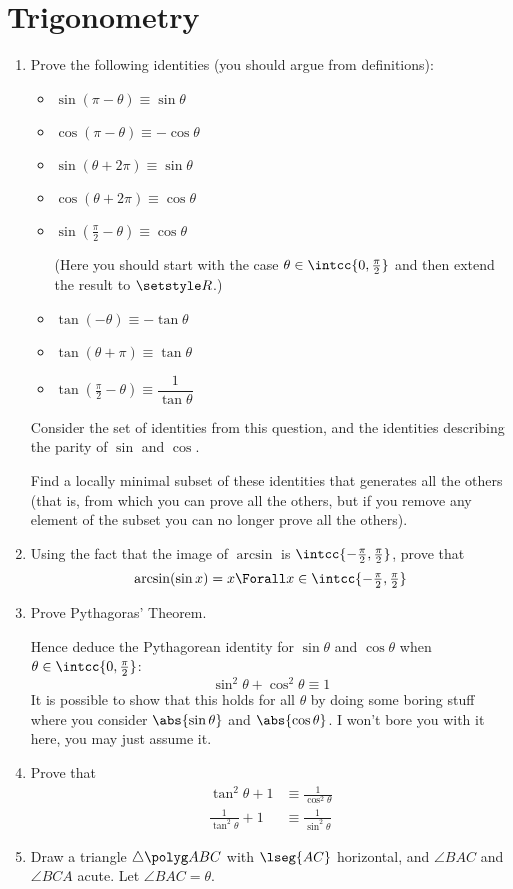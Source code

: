 \section{Trigonometry}

\begin{enumerate}
 \item
  Prove the following identities (you should argue from definitions):
  \begin{itemize}
   \item
    \(\sin(\pi - \theta) \equiv \sin \theta\)
   \item
    \(\cos(\pi - \theta) \equiv - \cos \theta\)
   \item
    \(\sin(\theta + 2\pi) \equiv \sin \theta\)
   \item
    \(\cos(\theta + 2\pi) \equiv \cos \theta\)
   \item
    \(\sin(\frac \pi 2 - \theta) \equiv \cos \theta\)

    (Here you should start with the case \(\theta \in \intcc{0, \frac \pi 2}\)
    and then extend the result to \(\Reals\).)
   \item
    \(\tan(-\theta) \equiv -\tan \theta\)
   \item
    \(\tan(\theta + \pi) \equiv \tan \theta\)
   \item
    \(\tan(\frac \pi 2 - \theta) \equiv \dfrac 1{\tan \theta}\)
  \end{itemize}
  Consider the set of identities from this question, and the identities
  describing the parity of \(\sin\) and \(\cos\).

  Find a locally minimal subset of these identities that generates all the
  others (that is, from which you can prove all the others, but if you remove
  any element of the subset you can no longer prove all the others).
 \item
  Using the fact that the image of \(\arcsin\) is
  \(\intcc{-\frac \pi 2, \frac \pi 2}\), prove that
  \begin{equation*}
   \arcsin(\sin x) = x \Forall x \in \intcc{-\tfrac \pi 2, \tfrac \pi 2}
  \end{equation*}
 \item
  Prove Pythagoras' Theorem.

  Hence deduce the Pythagorean identity for \(\sin \theta\) and \(\cos \theta\)
  when \(\theta \in \intcc{0, \frac \pi 2}\):
  \begin{equation*}
   \sin^2 \theta + \cos^2 \theta \equiv 1
  \end{equation*}
  It is possible to show that this holds for all \(\theta\) by doing some boring
  stuff where you consider \(\abs{\sin \theta}\) and \(\abs{\cos \theta}\). I
  won't bore you with it here, you may just assume it.
 \item
  Prove that
  \begin{align*}
   \tan^2 \theta + 1 &\equiv \frac 1{\cos^2 \theta} \\
   \frac 1{\tan^2 \theta} + 1 &\equiv \frac 1{\sin^2 \theta}
  \end{align*}
 \item
  Draw a triangle \(\tri{ABC}\) with \(\lseg{AC}\) horizontal, and
  \(\angle{BAC}\) and \(\angle{BCA}\) acute. Let \(\angle{BAC} = \theta\).


\end{enumerate}
